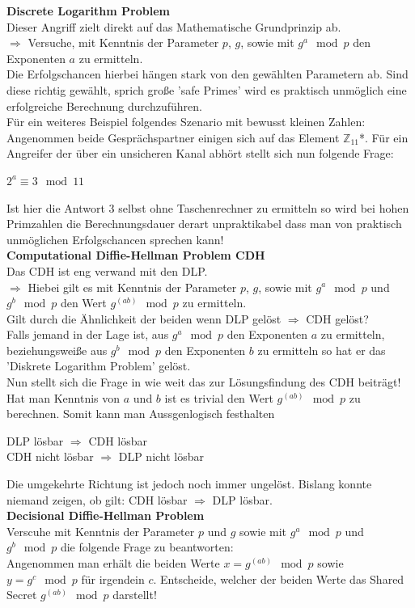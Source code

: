 \documentclass[a4paper,12pt]{scrartcl}
\begin{document}
\newpage
\textbf{Discrete Logarithm Problem}\\
Dieser Angriff zielt direkt auf das Mathematische Grundprinzip ab.\\
$\Rightarrow$
Versuche, mit Kenntnis der Parameter $p$, $g$, sowie mit $g^a \mod p$ den Exponenten $a$ zu
ermitteln.\\
 Die Erfolgschancen hierbei hängen  stark von den gewählten Parametern ab. Sind diese richtig gewählt, sprich große 'safe Primes' wird es praktisch unmöglich eine erfolgreiche Berechnung durchzuführen.\\
Für ein weiteres Beispiel folgendes Szenario mit bewusst kleinen Zahlen:\\
Angenommen beide Gesprächspartner einigen sich auf das Element $\mathbb{Z}_{11}$*. Für ein Angreifer der über ein unsicheren Kanal abhört stellt sich nun folgende Frage:\\
\begin{center}
 $2^a \equiv 3 \mod 11$
\end{center}
Ist hier die Antwort $3$ selbst ohne Taschenrechner zu ermitteln so wird bei hohen Primzahlen die Berechnungsdauer derart unpraktikabel dass man von praktisch unmöglichen Erfolgschancen sprechen kann!
\\
\newline
\textbf{Computational Diffie-Hellman Problem CDH}\\
Das CDH ist eng verwand mit den DLP.\\
$\Rightarrow$ Hiebei gilt es mit Kenntnis der Parameter $p$, $g$, sowie mit $g^a \mod p$ und $g^b \mod p$ den Wert $g^(ab) \mod p$ zu ermitteln.\\
Gilt durch die Ähnlichkeit der beiden wenn DLP gelöst $\Rightarrow$ CDH gelöst?\\

Falls jemand in der Lage ist, aus $g^a \mod p$ den Exponenten $a$ zu ermitteln, beziehungsweiße aus $g^b \mod p$ den Exponenten $b$ zu ermitteln so hat er das 'Diskrete Logarithm Problem' gelöst.\\
Nun stellt sich die Frage in wie weit das zur Lösungsfindung des  CDH beiträgt!\\
Hat man Kenntnis von $a$ und $b$ ist es trivial den Wert $g^(ab) \mod p$ zu berechnen. Somit kann man Aussgenlogisch festhalten
\begin{center}
 DLP lösbar $\Rightarrow$ CDH lösbar\\
 CDH nicht lösbar $\Rightarrow$ DLP nicht lösbar
\end{center}
Die umgekehrte Richtung ist jedoch noch immer ungelöst. Bislang konnte niemand zeigen,
ob gilt: CDH lösbar $\Rightarrow$ DLP lösbar.
\\
\newline
\textbf{Decisional Diffie-Hellman Problem}\\

Verscuhe mit Kenntnis der Parameter $p$ und $g$ sowie mit $g^a \mod p$  und $g^b \mod p$ die folgende Frage zu beantworten:\\
Angenommen man erhält die beiden Werte $x = g^(ab) \mod p$ sowie $y = g^c \mod p$ für irgendein $c$. Entscheide, welcher der beiden Werte das Shared Secret $g^(ab) \mod p$ darstellt!
\end{document}
